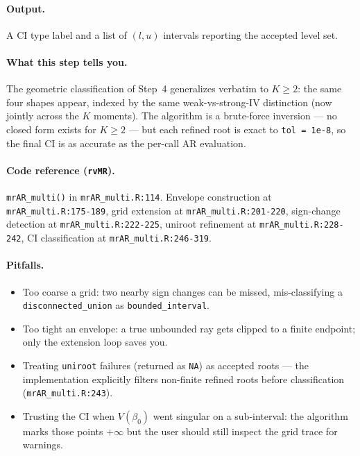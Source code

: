 \documentclass[11pt]{article}
\begin{document}
\paragraph{Output.} A CI type label and a list of $(l,u)$ intervals reporting the accepted level set.

\paragraph{What this step tells you.} The geometric classification of Step~4 generalizes verbatim to $K\ge 2$: the same four shapes appear, indexed by the same weak-vs-strong-IV distinction (now jointly across the $K$ moments). The algorithm is a brute-force inversion --- no closed form exists for $K\ge 2$ --- but each refined root is exact to \texttt{tol = 1e-8}, so the final CI is as accurate as the per-call AR evaluation.

\paragraph{Code reference (\texttt{rvMR}).} \verb|mrAR_multi()| in \verb|mrAR_multi.R:114|. Envelope construction at \verb|mrAR_multi.R:175-189|, grid extension at \verb|mrAR_multi.R:201-220|, sign-change detection at \verb|mrAR_multi.R:222-225|, uniroot refinement at \verb|mrAR_multi.R:228-242|, CI classification at \verb|mrAR_multi.R:246-319|.

\paragraph{Pitfalls.}
\begin{itemize}
\item Too coarse a grid: two nearby sign changes can be missed, mis-classifying a \texttt{disconnected\_union} as \texttt{bounded\_interval}.
\item Too tight an envelope: a true unbounded ray gets clipped to a finite endpoint; only the extension loop saves you.
\item Treating \verb|uniroot| failures (returned as \verb|NA|) as accepted roots --- the implementation explicitly filters non-finite refined roots before classification (\verb|mrAR_multi.R:243|).
\item Trusting the CI when $V(\beta_0)$ went singular on a sub-interval: the algorithm marks those points $+\infty$ but the user should still inspect the grid trace for warnings.
\end{itemize}
\end{document}
